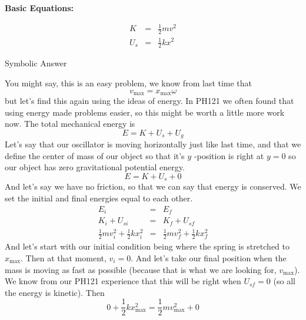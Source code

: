 \documentclass{book}
\begin{document}
\textbf{Basic Equations:}

\begin{eqnarray*}
K &=&\frac{1}{2}mv^{2} \\
U_{s} &=&\frac{1}{2}kx^{2}
\end{eqnarray*}

Symbolic Answer

You might say, this is an easy problem, we know from last time that 
\begin{equation*}
v_{\max }=x_{\max }\omega
\end{equation*}%
but let's find this again using the ideas of energy. In PH121 we often found
that using energy made problems easier, so this might be worth a little more
work now. The total mechanical energy is 
\begin{equation*}
E=K+U_{s}+U_{g}
\end{equation*}%
Let's say that our oscillator is moving horizontally just like last time,
and that we define the center of mass of our object so that it's $y$%
-position is right at $y=0$ so our object has zero gravitational potential
energy. 
\begin{equation*}
E=K+U_{s}+0
\end{equation*}%
And let's say we have no friction, so that we can say that energy is
conserved. We set the initial and final energies equal to each other. 
\begin{eqnarray*}
E_{i} &=&E_{f} \\
K_{i}+U_{si} &=&K_{f}+U_{sf} \\
\frac{1}{2}mv_{i}^{2}+\frac{1}{2}kx_{i}^{2} &=&\frac{1}{2}mv_{f}^{2}+\frac{1%
}{2}kx_{f}^{2}
\end{eqnarray*}%
And let's start with our initial condition being where the spring is
stretched to $x_{\max }.$ Then at that moment, $v_{i}=0.$ And let's take our
final position when the mass is moving as fast as possible (because that is
what we are looking for, $v_{\max }$). We know from our PH121 experience
that this will be right when $U_{sf}=0$ (so all the energy is kinetic). Then 
\begin{equation*}
0+\frac{1}{2}kx_{\max }^{2}=\frac{1}{2}mv_{\max }^{2}+0
\end{equation*}%
\end{document}
